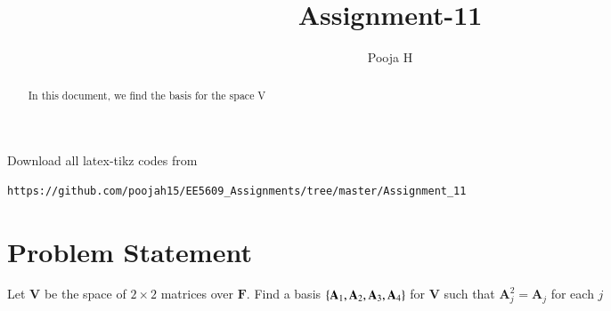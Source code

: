 \documentclass[journal,12pt,twocolumn]{IEEEtran}
\begin{document}
\let\vec\mathbf
\renewcommand{\thefigure}{\theproblem}
\def\putbox#1#2#3{\makebox[0in][l]{\makebox[#1][l]{}\raisebox{\baselineskip}[0in][0in]{\raisebox{#2}[0in][0in]{#3}}}}
     \def\rightbox#1{\makebox[0in][r]{#1}}
     \def\centbox#1{\makebox[0in]{#1}}
     \def\topbox#1{\raisebox{-\baselineskip}[0in][0in]{#1}}
     \def\midbox#1{\raisebox{-0.5\baselineskip}[0in][0in]{#1}}
\vspace{3cm}
\title{Assignment-11}
\author{Pooja H \\ }
\maketitle
\newpage
\bigskip
\renewcommand{\thefigure}{\theenumi}
\renewcommand{\thetable}{\theenumi}
\newenvironment{amatrix}[1]{%
	\left(\begin{array}{@{}*{#1}{c}|c@{}}
	}{%
	\end{array}\right)
}

\begin{abstract}
In this document, we find the basis for the space V
\end{abstract}
Download all latex-tikz codes from 
\begin{lstlisting}
https://github.com/poojah15/EE5609_Assignments/tree/master/Assignment_11
\end{lstlisting}


\section{Problem Statement}
Let $\vec{V}$ be the space of $2\times2$ matrices over $\vec{F}$. Find a basis $\cbrak{\vec{A}_1, \vec{A}_2, \vec{A}_3, \vec{A}_4}$ for $\vec{V}$ such that $\vec{A}_j^2 = \vec{A}_j$ for each $j$
\end{document}
